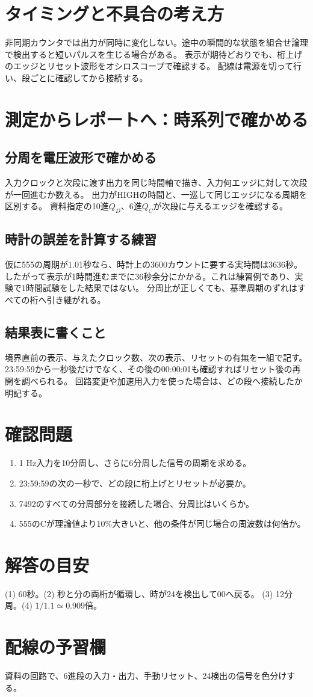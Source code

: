 \documentclass[lualatex,a4paper,10pt]{jlreq}
\begin{document}
\section{タイミングと不具合の考え方}\label{sec:auto6}
非同期カウンタでは出力が同時に変化しない。途中の瞬間的な状態を組合せ論理で検出すると短いパルスを生じる場合がある。
表示が期待どおりでも、桁上げのエッジとリセット波形をオシロスコープで確認する。
配線は電源を切って行い、段ごとに確認してから接続する。
\section{測定からレポートへ：時系列で確かめる}\label{sec:auto7}
\subsection{分周を電圧波形で確かめる}
入力クロックと次段に渡す出力を同じ時間軸で描き、入力何エッジに対して次段が一回進むか数える。
出力がHIGHの時間と、一巡して同じエッジになる周期を区別する。
資料指定の10進$Q_D$、6進$Q_C$が次段に与えるエッジを確認する。
\subsection{時計の誤差を計算する練習}
仮に555の周期が1.01秒なら、時計上の3600カウントに要する実時間は3636秒。
したがって表示が1時間進むまでに36秒余分にかかる。これは練習例であり、実験で1時間試験をした結果ではない。
分周比が正しくても、基準周期のずれはすべての桁へ引き継がれる。
\subsection{結果表に書くこと}
境界直前の表示、与えたクロック数、次の表示、リセットの有無を一組で記す。
23:59:59から一秒後だけでなく、その後の00:00:01も確認すればリセット後の再開を調べられる。
回路変更や加速用入力を使った場合は、どの段へ接続したか明記する。

\clearpage
\section{確認問題}\label{sec:auto8}
\begin{enumerate}
\item 1 Hz入力を10分周し、さらに6分周した信号の周期を求める。\answerline
\item 23:59:59の次の一秒で、どの段に桁上げとリセットが必要か。\answerline
\item 7492のすべての分周部分を接続した場合、分周比はいくらか。\answerline
\item 555のCが理論値より10\%大きいと、他の条件が同じ場合の周波数は何倍か。\answerline
\end{enumerate}
\section*{解答の目安}\label{sec:auto9}
(1) 60秒。(2) 秒と分の両桁が循環し、時が24を検出して00へ戻る。
(3) 12分周。(4) $1/1.1\simeq0.909$倍。
\section*{配線の予習欄}\label{sec:auto10}
資料の回路で、6進段の入力・出力、手動リセット、24検出の信号を色分けする。
\writing{25mm}
\prelabclosing
\end{document}
